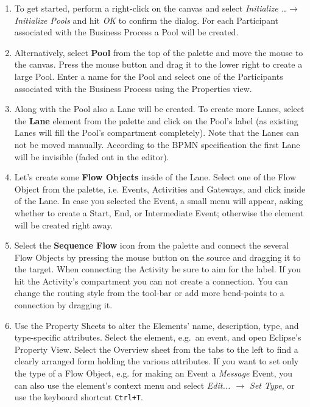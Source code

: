 \begin{enumerate}

	\item To get started, perform a right-click on the canvas and select
	\emph{Initialize \dots $\rightarrow$ Initialize Pools} and hit \emph{OK} to
	confirm the dialog.  For each Participant associated with the Business Process
	a Pool will be created.
	
	\item Alternatively, select \textbf{Pool} from the top of the palette and
	move the mouse to the canvas.  Press the mouse button and drag it to the lower
	right to create a large Pool.  Enter a name for the Pool and select one of
	the Participants associated with the Business Process using the Properties
	view.
	
	\item Along with the Pool also a Lane will be created.  To create more Lanes,
	select the \textbf{Lane} element from the palette and click on the Pool's
	label (as existing Lanes will fill the Pool's compartment completely).  Note
	that the Lanes can not be moved manually.  According to the BPMN specification
	the first Lane will be invisible (faded out in the editor).
	
	\item Let's create some \textbf{Flow Objects} inside of the Lane.  Select one
	of the Flow Object from the palette, i.e. Events, Activities and Gateways,
	and click inside of the Lane.  In case you selected the Event, a small menu
	will appear, asking whether to create a Start, End, or Intermediate Event;
	otherwise the element will be created right away.
		
	\item Select the \textbf{Sequence Flow} icon from the palette and connect the
	several Flow Objects by pressing the mouse button on the source and dragging
	it to the target.  When connecting the Activity be sure to aim for the label.
	If you hit the Activity's compartment you can not create a connection.  You
	can change the routing style from the tool-bar or add more bend-points to a
	connection by dragging it.
	
	\item Use the Property Sheets to alter the Elements' name, description, type,
	and type-specific attributes.  Select the element, e.g.\ an event, and open
	Eclipse's Property View.  Select the Overview sheet from the tabs to the left
	to find a clearly arranged form holding the various attributes.  If you want
	to set only the type of a Flow Object, e.g. for making an Event a \emph{Message}
	Event, you can also use the element's context menu and select \emph{Edit...
	$\rightarrow$ Set Type}, or use the keyboard shortcut \texttt{Ctrl+T}.


\end{enumerate}
